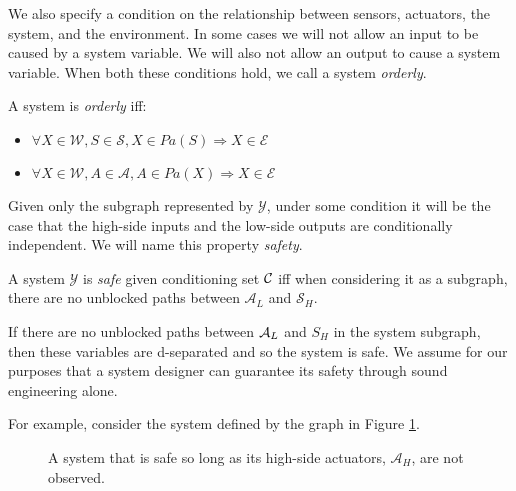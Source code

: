 \documentclass[../thesis.tex]{subfiles}
\begin{document}
%
%

We also specify a condition on the relationship
between sensors, actuators, the system, and the environment.
In some cases we will not allow an input to be caused
by a system variable.
We will also not allow an output to cause a system variable.
When both these conditions hold, we call a system \emph{orderly}.

\begin{dfn}[Orderly]
  \label{def:orderly-system}
  A system is \emph{orderly} iff:
  \begin{itemize}
  \item $\forall X \in \mathcal{W}, S \in \mathcal{S}, X \in Pa(S) \Longrightarrow X \in \mathcal{E}$
  \item $\forall X \in \mathcal{W}, A \in \mathcal{A}, A \in Pa(X) \Longrightarrow X \in \mathcal{E}$
  \end{itemize}
\end{dfn}

Given only the subgraph represented by $\mathcal{Y}$,
under some condition it will be the case that the
high-side inputs and the low-side outputs are conditionally
independent.
We will name this property \emph{safety}.

\begin{dfn}[Safe]
  A system $\mathcal{Y}$ is \emph{safe} given
  conditioning set $\mathcal{C}$ iff
  when considering it as a subgraph,
  there are no unblocked paths between 
  $\mathcal{A}_L$ and $\mathcal{S}_H$.
\end{dfn}

If there are no unblocked paths between $\mathcal{A}_L$ and ${S}_H$
in the system subgraph, then these variables are d-separated
and so the system is safe.
We assume for our purposes that a system designer can
guarantee its safety through sound engineering alone.

For example, consider the system defined by the graph in
Figure \ref{fig:safe-system}.

\begin{figure}
  \label{fig:safe-system}
\begin{center}
\end{center}
\caption{A system that is safe so long as its high-side actuators,
$\mathcal{A}_H$, are not observed.}
\end{figure}
\end{document}
